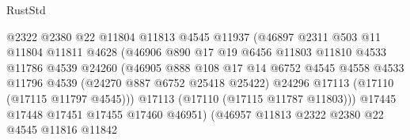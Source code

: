 \begin{lexlean}{RustStd}
\begin{coremodule}
                                    @2322
                                    @2380
                                    @22
                                    @11804
                                    @11813
                                    @4545
                                    @11937
                                    (@46897
                                      @2311
                                      @503
                                      @11
                                      @11804
                                      @11811
                                      @4628
                                      (@46906
                                        @890
                                        @17
                                        @19
                                        @6456
                                        @11803
                                        @11810
                                        @4533
                                        @11786
                                        @4539
                                        @24260
                                        (@46905
                                          @888
                                          @108
                                          @17
                                          @14
                                          @6752
                                          @4545
                                          @4558
                                          @4533
                                          @11796
                                          @4539
                                          (@24270 @887 @6752 @25418 @25422)
                                          @24296
                                          @17113
                                          (@17110 (@17115 @11797 @4545)))
                                        @17113
                                        (@17110 (@17115 @11787 @11803)))
                                      @17445
                                      @17448
                                      @17451
                                      @17455
                                      @17460
                                      @46951)
                                    (@46957
                                      @11813
                                      @2322
                                      @2380
                                      @22
                                      @4545
                                      @11816
                                      @11842

\end{coremodule}
\end{lexlean}
